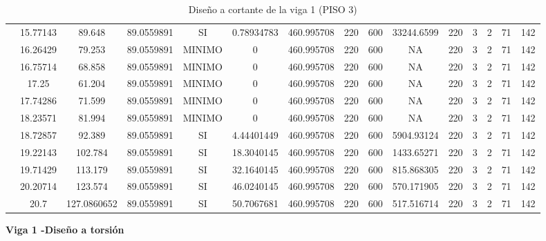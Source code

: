 \begin{table}[H]
{\begin{tabular}{|c|c|c|c|c|c|c|c|c|c|c|c|c|c|c|}
\cline{2-15}    & 15.77143 & 89.648 & 89.0559891 & SI  & 0.78934783 & 460.995708 & 220 & 600 & 33244.6599 & 220 & 3   & 2   & 71  & 142 \bigstrut\\
\cline{2-15}    & 16.26429 & 79.253 & 89.0559891 & MINIMO & 0   & 460.995708 & 220 & 600 & NA  & 220 & 3   & 2   & 71  & 142 \bigstrut\\
\cline{2-15}    & 16.75714 & 68.858 & 89.0559891 & MINIMO & 0   & 460.995708 & 220 & 600 & NA  & 220 & 3   & 2   & 71  & 142 \bigstrut\\
\cline{2-15}    & 17.25 & 61.204 & 89.0559891 & MINIMO & 0   & 460.995708 & 220 & 600 & NA  & 220 & 3   & 2   & 71  & 142 \bigstrut\\
\cline{2-15}    & 17.74286 & 71.599 & 89.0559891 & MINIMO & 0   & 460.995708 & 220 & 600 & NA  & 220 & 3   & 2   & 71  & 142 \bigstrut\\
\cline{2-15}    & 18.23571 & 81.994 & 89.0559891 & MINIMO & 0   & 460.995708 & 220 & 600 & NA  & 220 & 3   & 2   & 71  & 142 \bigstrut\\
\cline{2-15}    & 18.72857 & 92.389 & 89.0559891 & SI  & 4.44401449 & 460.995708 & 220 & 600 & 5904.93124 & 220 & 3   & 2   & 71  & 142 \bigstrut\\
\cline{2-15}    & 19.22143 & 102.784 & 89.0559891 & SI  & 18.3040145 & 460.995708 & 220 & 600 & 1433.65271 & 220 & 3   & 2   & 71  & 142 \bigstrut\\
\cline{2-15}    & 19.71429 & 113.179 & 89.0559891 & SI  & 32.1640145 & 460.995708 & 220 & 600 & 815.868305 & 220 & 3   & 2   & 71  & 142 \bigstrut\\
\cline{2-15}    & 20.20714 & 123.574 & 89.0559891 & SI  & 46.0240145 & 460.995708 & 220 & 600 & 570.171905 & 220 & 3   & 2   & 71  & 142 \bigstrut\\
\cline{2-15}    & 20.7 & 127.0860652 & 89.0559891 & SI  & 50.7067681 & 460.995708 & 220 & 600 & 517.516714 & 220 & 3   & 2   & 71  & 142 \bigstrut\\
\hline
\end{tabular}%

  }%
    \caption{Diseño a cortante de la viga 1 (PISO 3) }
  \label{tab:C VG1 P3 }%
\end{table}%
\newpage
\textbf{Viga 1 -Diseño a torsión}
